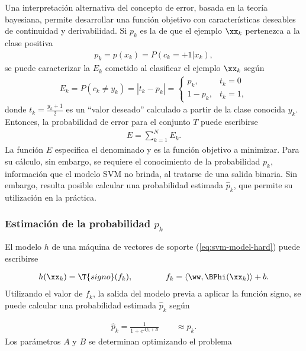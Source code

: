 Una interpretación alternativa del concepto de error, basada en la
teoría bayesiana, permite desarrollar una función objetivo con
características deseables de continuidad y derivabilidad.  Si $p_k$ es
la  de que el ejemplo $\xx_k$ pertenezca
a la clase positiva
%
\begin{align}
  \label{e3:pk}
  p_k = p(x_k) = P(c_k=+1|x_k), %
\end{align}
%
se puede caracterizar la  $E_k$ cometido al
clasificar el ejemplo $\xx_k$ según
%
\begin{align}
\label{e3:Ek}
  E_k = P(c_k\neq y_k) = |t_k-{p}_k| =
  \begin{cases}
    {p}_k, & t_k=0\\ 1-{p}_k, & t_k = 1,
  \end{cases}
\end{align}
%
donde $t_k=\frac{y_k+1}{2}$ es un ``valor deseado'' calculado a partir
de la clase conocida $y_k$.  Entonces, la probabilidad de error para
el conjunto $T$ puede escribirse
%
\begin{align}
\label{Err1}
  E = \sum_{k=1}^{N} E_k.
\end{align}
%
La función $E$ especifica el denominado  y es la
función objetivo a minimizar. Para su cálculo, sin embargo, se
requiere el conocimiento de la probabilidad $p_k$, información que el
modelo SVM no brinda, al tratarse de una salida binaria. Sin embargo,
resulta posible calcular una probabilidad estimada $\hat{p}_k$, que
permite su utilización en la práctica.

\subsubsection{Estimación de la probabilidad ${p}_k$}
El modelo $h$ de una máquina de vectores de soporte
(\autoref{eq:svm-model-hard}) puede escribirse

\begin{align*}
  h(\xx_k) = \T{signo}(f_k), \qquad\qquad
  f_k=\langle\ww,\BPhi(\xx_k)\rangle+b.
\end{align*}
Utilizando el valor de $f_k$, la salida del modelo
previa a aplicar la función signo, se puede calcular una probabilidad
estimada $\hat{p}_k$ según

\begin{align}
  \hat{p}_k=\frac{1}{1+e^{Af_k+B}} \qquad \approx p_k.
\end{align}
Los parámetros $A$ y $B$ se determinan optimizando el problema

